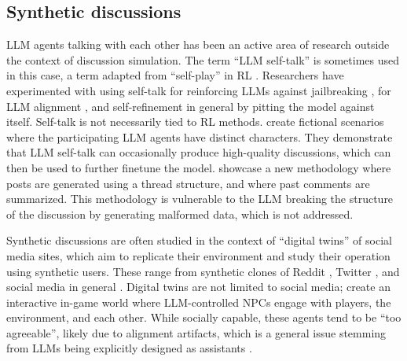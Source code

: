 \subsection{Synthetic discussions}
\label{ssec:related:discussions}

\ac{LLM} agents talking with each other has been an active area of research outside the context of discussion simulation. The term “\ac{LLM} self-talk” is sometimes used in this case, a term adapted from “self-play” in \ac{RL} \citep{cheng-self-play, ulmer2024}. Researchers have experimented with using self-talk for reinforcing \acp{LLM} against jailbreaking \cite{liu2024largelanguagemodelsagents, cheng-self-play, zheng2024optimalllmalignmentsusing}, for \ac{LLM} alignment \cite{Bai2022ConstitutionalAH, collective_constitution}, and self-refinement in general \cite{Madaan2023SelfRefineIR, lambert2024} by pitting the model against itself. Self-talk is not necessarily tied to \ac{RL} methods. \citet{ulmer2024} create fictional scenarios where the participating \ac{LLM} agents have distinct characters. They demonstrate that \ac{LLM} self-talk can occasionally produce high-quality discussions, which can then be used to further finetune the model. \citet{balog_2024} showcase a new methodology where posts are generated using a thread structure, and where past comments are summarized. This methodology is vulnerable to the \ac{LLM} breaking the structure of the discussion by generating malformed data, which is not addressed.

Synthetic discussions are often studied in the context of “digital twins” of social media sites, which aim to replicate their environment and study their operation using synthetic users. These range from synthetic clones of Reddit \cite{park_simulacra}, Twitter \cite{mou_2024}, and social media in general \cite{tornberg_2023, y_social}. Digital twins are not limited to social media; \citet{Park2023GenerativeAI} create an interactive in-game world where \ac{LLM}-controlled \acp{NPC} engage with players, the environment, and each other. While socially capable, these agents tend to be “too agreeable”, likely due to alignment artifacts, which is a general issue stemming from \acp{LLM} being explicitly designed as assistants \cite{anthis_2025}.

